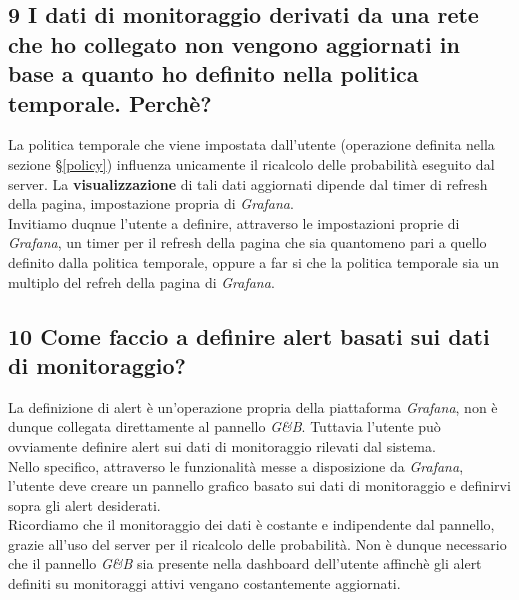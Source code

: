 \subsection*{9 I dati di monitoraggio derivati da una rete che ho collegato non vengono aggiornati in base a quanto ho definito nella politica temporale. Perchè?}
La politica temporale che viene impostata dall'utente (operazione definita nella sezione §\ref{policy}) influenza unicamente il ricalcolo delle probabilità eseguito dal server. La \textbf{visualizzazione} di tali dati aggiornati dipende dal timer di refresh della pagina, impostazione propria di \textit{Grafana}.\\
Invitiamo duqnue l'utente a definire, attraverso le impostazioni proprie di \textit{Grafana}, un timer per il refresh della pagina che sia quantomeno pari a quello definito dalla politica temporale, oppure a far si che la politica temporale sia un multiplo del refreh della pagina di \textit{Grafana}.\\

\subsection*{10 Come faccio a definire alert basati sui dati di monitoraggio?}
La definizione di alert è un'operazione propria della piattaforma \textit{Grafana}, non è dunque collegata direttamente al pannello \textit{G\&B}. Tuttavia l'utente può ovviamente definire alert sui dati di monitoraggio rilevati dal sistema.\\
Nello specifico, attraverso le funzionalità messe a disposizione da \textit{Grafana}, l'utente deve creare un pannello grafico basato sui dati di monitoraggio e definirvi sopra gli alert desiderati.\\
Ricordiamo che il monitoraggio dei dati è costante e indipendente dal pannello, grazie all'uso del server per il ricalcolo delle probabilità. Non è dunque necessario che il pannello \textit{G\&B} sia presente nella dashboard dell'utente affinchè gli alert definiti su monitoraggi attivi vengano costantemente aggiornati.

